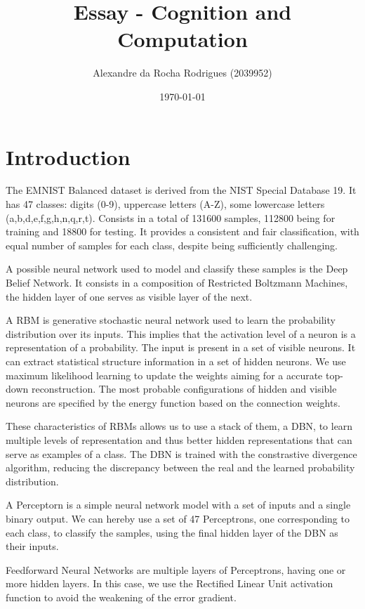 \documentclass[a4paper, 11pt]{article}
\begin{document}
	
	\title{Essay - Cognition and Computation }
	\author{{\small Alexandre da Rocha Rodrigues (2039952)}}
	\date{\today}
	\maketitle
	
	\section{Introduction}
	
		The EMNIST \cite{emnist} Balanced dataset is derived from the NIST Special Database 19.
		It has 47 classes: digits (0-9), uppercase letters (A-Z), some lowercase letters (a,b,d,e,f,g,h,n,q,r,t).
		Consists in a total of 131600 samples, 112800 being for training and 18800 for testing.
		It provides a consistent and fair classification, with equal number of samples for each class, despite being sufficiently challenging. 
		
		A possible neural network used to model and classify these samples is the Deep Belief Network.
		It consists in a composition of Restricted Boltzmann Machines, the hidden layer of one serves as visible layer of the next.
		
		A RBM is generative stochastic neural network used to learn the probability distribution over its inputs.
		This implies that the activation level of a neuron is a representation of a probability.
		The input is present in a set of visible neurons.
		It can extract statistical structure information in a set of hidden neurons.
		We use maximum likelihood learning to update the weights aiming for a accurate top-down reconstruction.
		The most probable configurations of hidden and visible neurons are specified by the energy function based on the connection weights.
		
		These characteristics of RBMs allows us to use a stack of them, a DBN, to learn multiple levels of representation and thus better hidden representations that can serve as examples of a class.
		The DBN is trained with the constrastive divergence algorithm, reducing the discrepancy between the real and the learned probability distribution.
		
		A Perceptorn is a simple neural network model with a set of inputs and a single binary output.
		We can hereby use a set of 47 Perceptrons, one corresponding to each class, to classify the samples, using the final hidden layer of the DBN as their inputs.
		
		Feedforward Neural Networks are multiple layers of Perceptrons, having one or more hidden layers.
		In this case, we use the Rectified Linear Unit activation function to avoid the weakening of the error gradient.
		
\end{document}
